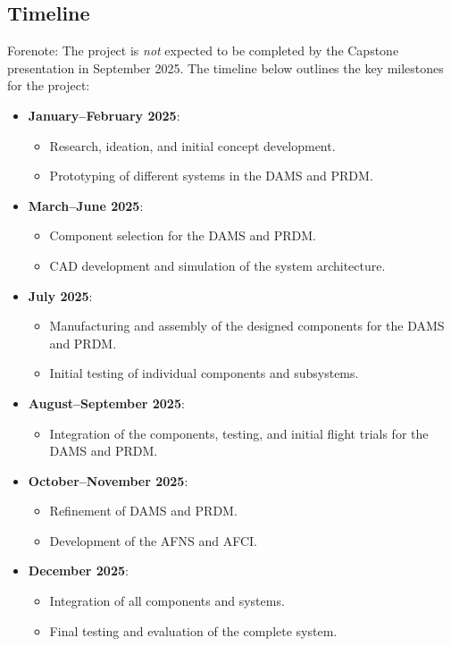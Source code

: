 \documentclass[12pt]{article}
\begin{document}
\subsection{Timeline}
Forenote: The project is \textit{not} expected to be completed by the Capstone presentation in September 2025. The timeline below outlines the key milestones for the project:
\begin{itemize}
    \item \textbf{January–February 2025}:
    \begin{itemize}
        \item Research, ideation, and initial concept development.
        \item Prototyping of different systems in the DAMS and PRDM.
    \end{itemize}
    \item \textbf{March–June 2025}:
    \begin{itemize}
        \item Component selection for the DAMS and PRDM.
        \item CAD development and simulation of the system architecture.
    \end{itemize}
    \item \textbf{July 2025}:
    \begin{itemize}
        \item Manufacturing and assembly of the designed components for the DAMS and PRDM.
        \item Initial testing of individual components and subsystems.
    \end{itemize}
    \item \textbf{August–September 2025}:
    \begin{itemize}
        \item Integration of the components, testing, and initial flight trials for the DAMS and PRDM.
    \end{itemize}
    \item \textbf{October–November 2025}:
    \begin{itemize}
        \item Refinement of DAMS and PRDM.
        \item Development of the AFNS and AFCI.
    \end{itemize}
    \item \textbf{December 2025}:
    \begin{itemize}
        \item Integration of all components and systems.
        \item Final testing and evaluation of the complete system.
    \end{itemize}
\end{itemize}
\end{document}
